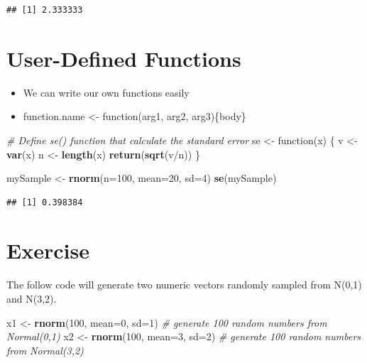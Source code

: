 \documentclass[]{book}
\newenvironment{Shaded}{\begin{snugshade}}{\end{snugshade}}
\newcommand{\KeywordTok}[1]{\textcolor[rgb]{0.13,0.29,0.53}{\textbf{{#1}}}}
\newcommand{\DataTypeTok}[1]{\textcolor[rgb]{0.13,0.29,0.53}{{#1}}}
\newcommand{\DecValTok}[1]{\textcolor[rgb]{0.00,0.00,0.81}{{#1}}}
\newcommand{\StringTok}[1]{\textcolor[rgb]{0.31,0.60,0.02}{{#1}}}
\newcommand{\CommentTok}[1]{\textcolor[rgb]{0.56,0.35,0.01}{\textit{{#1}}}}
\newcommand{\NormalTok}[1]{{#1}}
\providecommand{\tightlist}{%
  \setlength{\itemsep}{0pt}\setlength{\parskip}{0pt}}
\begin{document}
\begin{verbatim}
## [1] 2.333333
\end{verbatim}

\section{User-Defined Functions}\label{user-defined-functions}

\begin{itemize}
\tightlist
\item
  We can write our own functions easily
\item
  function.name \textless{}- function(arg1, arg2, arg3)\{body\}
\end{itemize}

\begin{Shaded}
\begin{Highlighting}[]
\CommentTok{# Define se() function that calculate the standard error}
\NormalTok{se <-}\StringTok{ }\NormalTok{function(x) \{}
  \NormalTok{v <-}\StringTok{ }\KeywordTok{var}\NormalTok{(x)}
  \NormalTok{n <-}\StringTok{ }\KeywordTok{length}\NormalTok{(x)}
  \KeywordTok{return}\NormalTok{(}\KeywordTok{sqrt}\NormalTok{(v/n))}
\NormalTok{\}}
\end{Highlighting}
\end{Shaded}

\begin{Shaded}
\begin{Highlighting}[]
\NormalTok{mySample <-}\StringTok{ }\KeywordTok{rnorm}\NormalTok{(}\DataTypeTok{n=}\DecValTok{100}\NormalTok{, }\DataTypeTok{mean=}\DecValTok{20}\NormalTok{, }\DataTypeTok{sd=}\DecValTok{4}\NormalTok{)}
\KeywordTok{se}\NormalTok{(mySample)}
\end{Highlighting}
\end{Shaded}

\begin{verbatim}
## [1] 0.398384
\end{verbatim}

\section{Exercise}\label{exercise-5}

The follow code will generate two numeric vectors randomly sampled from
N(0,1) and N(3,2).

\begin{Shaded}
\begin{Highlighting}[]
\NormalTok{x1 <-}\StringTok{ }\KeywordTok{rnorm}\NormalTok{(}\DecValTok{100}\NormalTok{, }\DataTypeTok{mean=}\DecValTok{0}\NormalTok{, }\DataTypeTok{sd=}\DecValTok{1}\NormalTok{)  }\CommentTok{# generate 100 random numbers from Normal(0,1)}
\NormalTok{x2 <-}\StringTok{ }\KeywordTok{rnorm}\NormalTok{(}\DecValTok{100}\NormalTok{, }\DataTypeTok{mean=}\DecValTok{3}\NormalTok{, }\DataTypeTok{sd=}\DecValTok{2}\NormalTok{)  }\CommentTok{# generate 100 random numbers from Normal(3,2)}
\end{Highlighting}
\end{Shaded}
\end{document}
